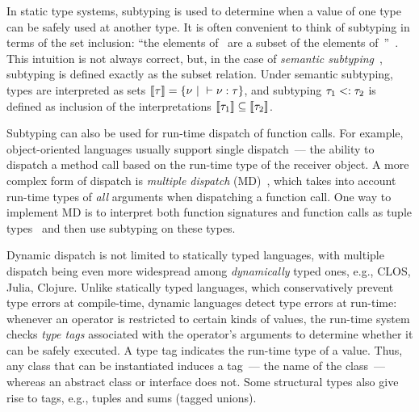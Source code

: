 
In static type systems, subtyping is used to determine
when a value of one type can be safely used at another type.
It is often convenient to think of subtyping 
in terms of the set inclusion: ``the elements of~ are a subset
of the elements of~''~\cite{bib:Pierce:2002:TAPL}.
This intuition is not always correct, but, in the case of
\emph{semantic subtyping}~\cite{bib:Hosoya:2003:XDuce,
	bib:Frisch:2008:sem-sub, bib:Ancona:2016:sem-sub-oo}, 
subtyping is defined exactly as the subset relation. %
Under semantic subtyping, types are interpreted as sets
$\llbracket \tau \rrbracket = \{\nu ~\vert~ \vdash \nu : \tau \}$, 
and subtyping $\tau_1 <: \tau_2$ is defined as inclusion 
of the interpretations
$\llbracket \tau_1 \rrbracket \subseteq \llbracket \tau_2 \rrbracket$.

Subtyping can also be used for run-time dispatch of function calls.
For example, object-oriented languages
usually support single dispatch~--- the ability to dispatch a method call 
based on the run-time type of the receiver object.
A more complex form of dispatch is \emph{multiple dispatch}
(MD)~\cite{bib:Chambers:1992:Cecil,bib:Clifton:2000:MultiJava},
which takes into account run-time types of \emph{all} arguments
when dispatching a function call.
One way to implement MD is to interpret both function signatures
and function calls
as tuple types~\cite{bib:Leavens:1998:mddtuples}
and then use subtyping on these types.

Dynamic dispatch is not limited to statically typed languages,
with multiple dispatch being even more widespread among 
\emph{dynamically} typed ones, e.g., CLOS, Julia, Clojure.
Unlike statically typed languages, 
which conservatively prevent type errors at compile-time, %
dynamic languages detect type errors at run-time:
whenever an operator is restricted to certain kinds of values,
the run-time system checks \emph{type tags} associated 
with the operator's arguments
to determine whether it can be safely executed.
A type tag indicates the run-time type of a value.
Thus, any class that can be instantiated induces a tag~--- 
the name of the class~--- 
whereas an abstract class or interface does not.
Some structural types also give rise to tags, 
e.g., tuples and sums (tagged unions).

